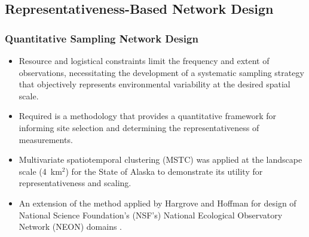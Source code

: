 \subsection[Representativeness]{Representativeness-Based Network Design}
%
%
\begin{frame}
 \frametitle{Quantitative Sampling Network Design}
 \begin{itemize}
  \item Resource and logistical constraints limit the frequency and extent
  of observations, necessitating the development of a systematic sampling
  strategy that objectively represents environmental variability at the
  desired spatial scale.
  \item Required is a methodology that provides a quantitative framework
  for informing site selection and determining the representativeness
  of measurements.
  \item Multivariate spatiotemporal clustering (MSTC) was applied at
  the landscape scale (4~km$^2$) for the State of Alaska to demonstrate
  its utility for representativeness and scaling.
  \item An extension of the method applied by Hargrove and Hoffman for
  design of National Science Foundation's (NSF's) National Ecological
  Observatory Network (NEON) domains \citep{Schimel_FrontEcolEnviron_20070301,Keller_FrontEcolEnviron_20080601}.
 \end{itemize}

\end{frame}



